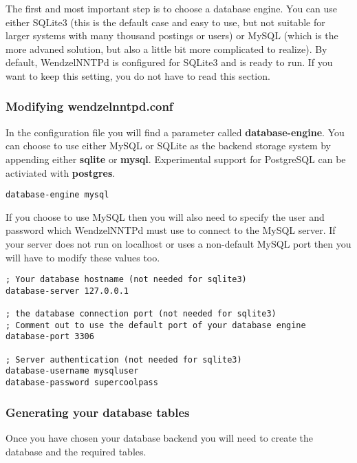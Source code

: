 \documentclass[12pt,fleqn,leqno]{scrbook}
\begin{document}
The first and most important step is to choose a database engine. You
can use either SQLite3 (this is the default case and easy to use, but
not suitable for larger systems with many thousand postings or users) or
MySQL (which is the more advaned solution, but also a little bit more
complicated to realize). By default, WendzelNNTPd is configured for
SQLite3 and is ready to run. If you want to keep this setting, you do
not have to read this section.

\hypertarget{modifying-wendzelnntpd.conf-1}{%
\subsubsection{Modifying
wendzelnntpd.conf}\label{modifying-wendzelnntpd.conf-1}}

In the configuration file you will find a parameter called
\textbf{database-engine}. You can choose to use either MySQL or SQLite
as the backend storage system by appending either \textbf{sqlite} or
\textbf{mysql}. Experimental support for PostgreSQL can be activiated
with \textbf{postgres}.

\begin{verbatim}
database-engine mysql
\end{verbatim}

If you choose to use MySQL then you will also need to specify the user
and password which WendzelNNTPd must use to connect to the MySQL server.
If your server does not run on localhost or uses a non-default MySQL
port then you will have to modify these values too.

\begin{verbatim}
; Your database hostname (not needed for sqlite3)
database-server 127.0.0.1

; the database connection port (not needed for sqlite3)
; Comment out to use the default port of your database engine
database-port 3306

; Server authentication (not needed for sqlite3)
database-username mysqluser
database-password supercoolpass
\end{verbatim}

\hypertarget{generating-your-database-tables-1}{%
\subsubsection{Generating your database
tables}\label{generating-your-database-tables-1}}

Once you have chosen your database backend you will need to create the
database and the required tables.
\end{document}
